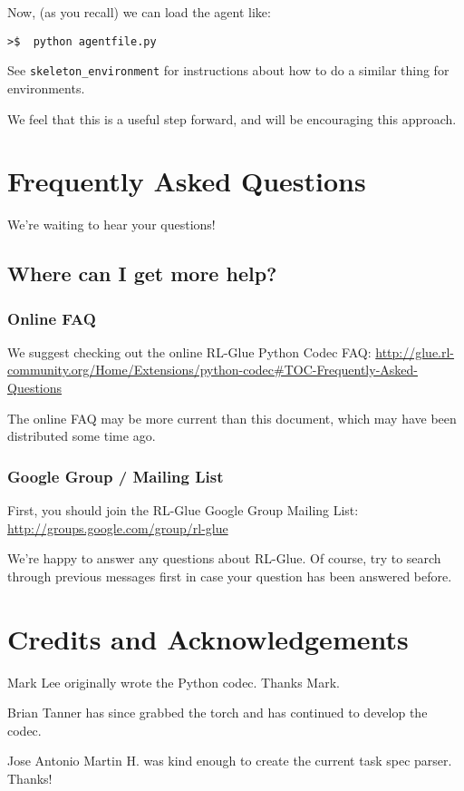 \documentclass[11pt]{article}
\begin{document}
Now, (as you recall) we can load the agent like:
\begin{verbatim}
>$  python agentfile.py
\end{verbatim}

See \texttt{skeleton\_environment} for instructions about how to do a similar thing for environments.

We feel that this is a useful step forward, and will be encouraging this approach.


\section{Frequently Asked Questions}
We're waiting to hear your questions!

\subsection{Where can I get more help?}
\subsubsection{Online FAQ}
We suggest checking out the online RL-Glue Python Codec FAQ:\newline
\url{http://glue.rl-community.org/Home/Extensions/python-codec#TOC-Frequently-Asked-Questions}

The online FAQ may be more current than this document, which may have been distributed some time ago.

\subsubsection{Google Group / Mailing List}
First, you should join the RL-Glue Google Group Mailing List:\newline
\url{http://groups.google.com/group/rl-glue}

We're happy to answer any questions about RL-Glue.  Of course, try to search through previous messages first in case your question has been answered before.

\section{Credits and Acknowledgements}
Mark Lee originally wrote the Python codec.  Thanks Mark.

Brian Tanner has since grabbed the torch and has continued to develop the codec.

Jose Antonio Martin H. was kind enough to create the current task spec parser. Thanks!
\end{document}
